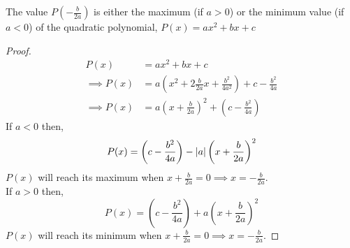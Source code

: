 \begin{theorem}
    The value $P\left(-\frac{b}{2a}\right)$ is either the maximum (if $a>0$) or the minimum value (if $a<0$) of 
    the quadratic polynomial, $P(x)=ax^{2} + bx + c$
\end{theorem}
\begin{proof}
    \begin{align*}
                 P(x) &= ax^{2} + bx + c\\
        \implies P(x) &= a\left( x^{2} + 2\frac{b}{2a} x + \frac{b^{2}}{4a^{2}}\right) + c - \frac{b^{2}}{4a} \\
        \implies P(x) &= a\left(x + \frac{b}{2a}\right)^{2} + \left( c - \frac{b^{2}}{4a} \right)
    \end{align*}
    If $a<0$ then, 
    \[
        P(x) = \left( c - \frac{b^{2}}{4a}\right) - \left\lvert a \right\rvert\left(x + \frac{b}{2a}\right)^{2}
    \]
    $P(x)$ will reach its maximum when $x + \frac{b}{2a} =0 \implies x = -\frac{b}{2a}$.\\
    If $a>0$ then,
    \[
        P(x) = \left( c - \frac{b^{2}}{4a}\right) + a\left(x + \frac{b}{2a}\right)^{2}
    \]
    $P(x)$ will reach its minimum when $x + \frac{b}{2a} =0 \implies x = -\frac{b}{2a}$.
\end{proof}

